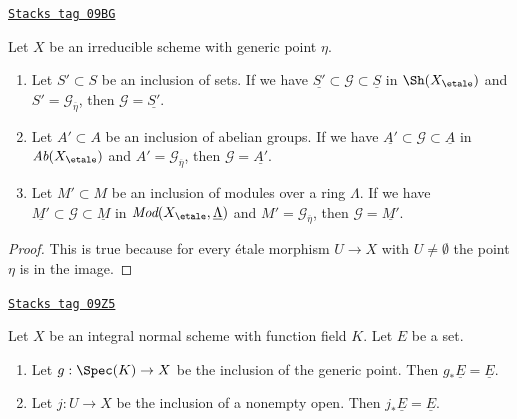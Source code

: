 \begin{lemma}
\label{etale-cohomology-lemma-irreducible-subsheaf-constant-zero}
\href{https://stacks.math.columbia.edu/tag/09BG}{\texttt{Stacks tag 09BG}}

Let $X$ be an irreducible scheme with generic point $\eta$.
\begin{enumerate}
\item Let $S' \subset S$ be an inclusion of sets. If we have
$\underline{S'} \subset \mathcal{G} \subset \underline{S}$
in $\Sh(X_\etale)$ and $S' = \mathcal{G}_{\overline{\eta}}$, then
$\mathcal{G} = \underline{S'}$.
\item Let $A' \subset A$ be an inclusion of abelian groups. If we have
$\underline{A'} \subset \mathcal{G} \subset \underline{A}$
in $\textit{Ab}(X_\etale)$ and $A' = \mathcal{G}_{\overline{\eta}}$, then
$\mathcal{G} = \underline{A'}$.
\item Let $M' \subset M$ be an inclusion of modules over a ring $\Lambda$.
If we have $\underline{M'} \subset \mathcal{G} \subset \underline{M}$
in $\textit{Mod}(X_\etale, \underline{\Lambda})$
and $M' = \mathcal{G}_{\overline{\eta}}$, then
$\mathcal{G} = \underline{M'}$.
\end{enumerate}
\end{lemma}

\begin{proof}
This is true because for every \'etale morphism $U \to X$
with $U \not = \emptyset$ the point $\eta$ is in the image.
\end{proof}

\begin{lemma}
\label{etale-cohomology-lemma-push-constant-sheaf-from-open}
\href{https://stacks.math.columbia.edu/tag/09Z5}{\texttt{Stacks tag 09Z5}}

Let $X$ be an integral normal scheme with function field $K$.
Let $E$ be a set.
\begin{enumerate}
\item Let $g : \Spec(K) \to X$ be the inclusion of the generic point.
Then $g_*\underline{E} = \underline{E}$.
\item Let $j : U \to X$ be the inclusion of a nonempty open. Then
$j_*\underline{E} = \underline{E}$.
\end{enumerate}
\end{lemma}

